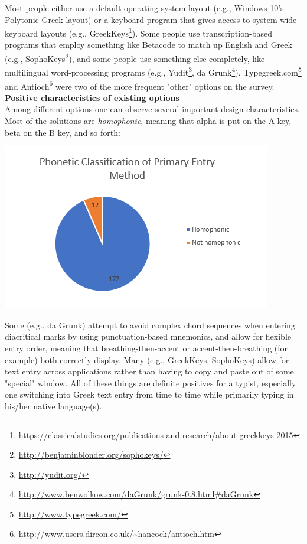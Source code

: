 \documentclass[11pt]{article}
\begin{document}
Most people either use a default operating system layout (e.g., Windows 10's Polytonic Greek layout) or a keyboard program that gives access to system-wide keyboard layouts (e.g., GreekKeys\footnote{\url{https://classicalstudies.org/publications-and-research/about-greekkeys-2015}}). Some people use transcription-based programs that employ something like Betacode to match up English and Greek (e.g., SophoKeys\footnote{\url{http://benjaminblonder.org/sophokeys/}}), and some people use something else completely, like multilingual word-processing programs (e.g., Yudit\footnote{\url{http://yudit.org/}}, da Grunk\footnote{\url{http://www.benwolkow.com/daGrunk/grunk-0.8.html\#daGrunk}}). Typegreek.com\footnote{\url{http://www.typegreek.com/}} and Antioch\footnote{\url{http://www.users.dircon.co.uk/\~hancock/antioch.htm}} were two of the more frequent "other" options on the survey. \\

\noindent \textbf{Positive characteristics of existing options} \\

Among different options one can observe several important design characteristics. Most of the solutions are \emph{homophonic}, meaning that alpha is put on the A key, beta on the B key, and so forth:

\begin{center}
\includegraphics[width=.9\linewidth]{./images/homophonic.PNG}
\end{center}

Some (e.g., da Grunk) attempt to avoid complex chord sequences when entering diacritical marks by using punctuation-based mnemonics, and allow for flexible entry order, meaning that breathing-then-accent or accent-then-breathing (for example) both correctly display. Many (e.g., GreekKeys, SophoKeys) allow for text entry across applications rather than having to copy and paste out of some "special" window. All of these things are definite positives for a typist, especially one switching into Greek text entry from time to time while primarily typing in his/her native language(s). \\
\end{document}
